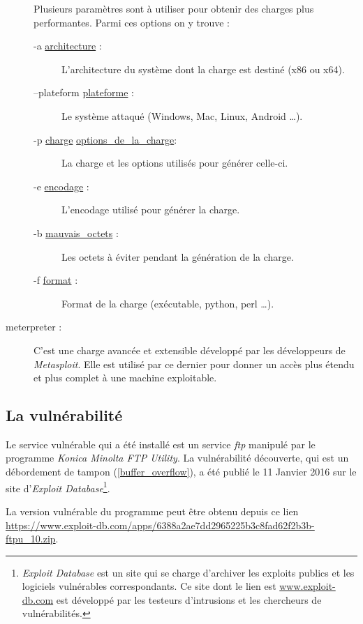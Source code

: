 \begin{description}
            Plusieurs paramètres sont à utiliser pour obtenir des charges plus performantes. Parmi ces options on y
            trouve :
            \begin{description}
                \item[-a \ul{architecture} :] L'architecture du système dont la charge est destiné
                    (x86 ou x64).
                \item[--plateform \ul{plateforme} :] Le système attaqué (Windows, Mac, Linux, Android
                \ldots{}).
                \item[-p \ul{charge} \ul{options\_de\_la\_charge}:] La charge et les options utilisés 
                    pour générer celle-ci.
                \item[-e \ul{encodage} :] L'encodage utilisé pour générer la charge.
                \item[-b \ul{mauvais\_octets} :] Les octets à éviter pendant la génération de la charge.
                \item[-f \ul{format} :] Format de la charge (exécutable, python, perl \ldots{}).
            \end{description}

        \item[meterpreter :] \label{meterpreter}C'est une charge avancée et extensible développé par les développeurs de 
            \emph{Metasploit}. Elle est utilisé par ce dernier pour donner un accès plus étendu et plus 
            complet à une machine exploitable. 
    \end{description}

    \subsection{La vulnérabilité}
    Le service vulnérable qui a été installé est un service \emph{ftp} manipulé par le programme 
    \emph{Konica Minolta FTP Utility}. 
    La vulnérabilité découverte, qui est un débordement de tampon (\autoref{buffer_overflow}), a été publié le 11
    Janvier 2016 sur le site d'\emph{Exploit Database}\footnote{\emph{Exploit Database} est un site qui se charge
    d'archiver les exploits publics et les logiciels vulnérables correspondants. Ce site dont le lien est 
    \url{www.exploit-db.com} est développé par les testeurs d'intrusions et les chercheurs de vulnérabilités.}.

    La version vulnérable du programme peut être obtenu depuis ce lien 
    \url{https://www.exploit-db.com/apps/6388a2ae7dd2965225b3c8fad62f2b3b-ftpu_10.zip}.

